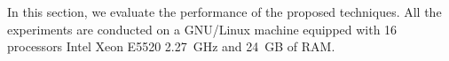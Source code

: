 In this section, we evaluate the performance of the proposed techniques. All the
experiments are conducted on a GNU/Linux machine equipped with 16 processors
Intel Xeon E5520 2.27~GHz and 24~GB of RAM.
